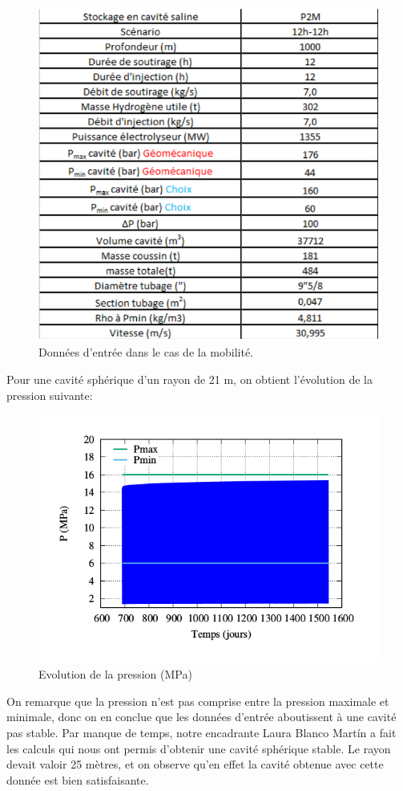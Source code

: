 \documentclass[11pt,french,a4paper]{article}
\begin{document}
\begin{figure}[h]
  \centering
  \includegraphics[width=0.8\linewidth]{image/annexe/cav_sal/p2mf.png}
  \caption{Données d'entrée dans le cas de la mobilité.}
  \end{figure}
\FloatBarrier
Pour une cavité sphérique d'un rayon de 21 m, on obtient l'évolution de la pression suivante:
\begin{figure}[h]
  \centering
  \includegraphics[width=0.8\linewidth]{image/annexe/cav_sal/P2M_faux/P.png}
  \caption{Evolution de la pression (MPa)}
  \end{figure}
\FloatBarrier
On remarque que la pression n'est pas comprise entre la pression maximale et minimale, donc on en conclue que les données d'entrée aboutissent à une cavité pas stable. Par manque de temps, notre encadrante Laura Blanco Martín a fait les calculs qui nous ont permis d'obtenir une cavité sphérique stable. Le rayon devait valoir 25 mètres, et on observe qu'en effet la cavité obtenue avec cette donnée est bien satisfaisante.
\end{document}
